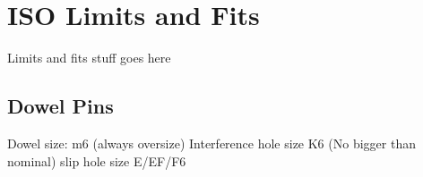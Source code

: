 \chapter{ISO Limits and Fits}
Limits and fits stuff goes here
\section{Dowel Pins}
Dowel size: m6 (always oversize)
Interference hole size K6 (No bigger than nominal)
slip hole size E/EF/F6

